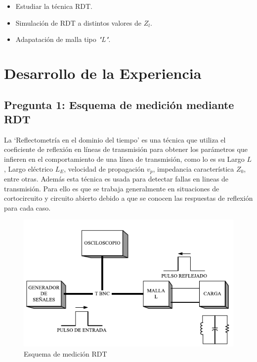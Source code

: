 \documentclass[11pt,onecolumn]{article}
\begin{document}
\begin{itemize}
\item Estudiar la técnica RDT.
\item Simulación de RDT a distintos valores de $Z_l$. 
\item Adapatación de malla tipo \textit{"L"}.
\end{itemize}



\newpage
\section{Desarrollo de la Experiencia}

\subsection*{Pregunta 1: Esquema de medición mediante RDT}

La `Reflectometría en el dominio del tiempo' es una técnica que  utiliza el coeficiente de reflexión en líneas de transmisión para obtener los parámetros que infieren en el comportamiento de una línea de transmisión, como lo es su Largo $L$, Largo eléctrico $L_{E}$, velocidad de propagación $v_{p}$, impedancia característica $Z_{0}$, entre otras. Además esta técnica es usada para detectar fallas en lineas de transmisión. Para ello es que se trabaja generalmente en situaciones de cortocircuito y circuito abierto debido a que se conocen las respuestas de reflexión para cada caso.

\begin{figure}
  \begin{center}
    \includegraphics[scale = 1]{img/schema.pdf}
  \end{center}
  \caption{Esquema de medición RDT}
  \label{fig:schrdt}
\end{figure}
\end{document}
